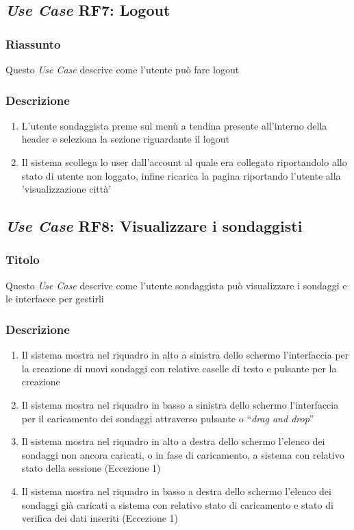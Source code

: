     \subsection{\textit{Use Case} RF7: Logout}
        \subsubsection{Riassunto}
            Questo \textit{Use Case} descrive come l'utente può fare logout
        \subsubsection{Descrizione}
            \begin{enumerate}
                \item L'utente sondaggista preme sul menù a tendina presente all'interno della header e seleziona la sezione riguardante il logout
                \item Il sistema scollega lo user dall'account al quale era collegato riportandolo allo stato di utente non loggato, infine 
                ricarica la pagina riportando l'utente alla 'visualizzazione città'
            \end{enumerate}

    \subsection{\textit{Use Case} RF8: Visualizzare i sondaggisti}
        \subsubsection{Titolo}
            Questo \textit{Use Case} descrive come l'utente sondaggista può visualizzare i sondaggi e le interfacce per gestirli
        \subsubsection{Descrizione}
            \begin{enumerate}
                \item Il sistema mostra nel riquadro in alto a sinistra dello schermo l'interfaccia per la creazione di nuovi sondaggi con relative caselle di testo e pulsante per la creazione
                \item Il sistema mostra nel riquadro in basso a sinistra dello schermo l'interfaccia per il caricamento dei sondaggi attraverso pulsante o ``\textit{drag and drop}''
                \item Il sistema mostra nel riquadro in alto a destra dello schermo l'elenco dei sondaggi non ancora caricati, o in fase di caricamento, a sistema con relativo stato della sessione (Eccezione 1)
                \item Il sistema mostra nel riquadro in basso a destra dello schermo l'elenco dei sondaggi già caricati a sistema con relativo stato di caricamento e stato di verifica dei dati inseriti (Eccezione 1)
            \end{enumerate}
